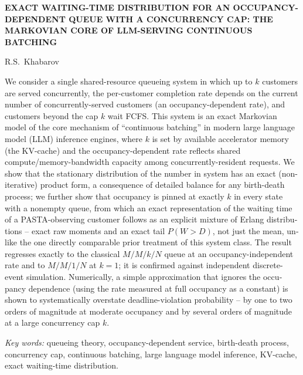 \documentclass[12pt,a4paper]{article}
\begin{document}
\bigskip
\begin{center}
\begin{minipage}{0.9\linewidth}
\centering
{\bfseries EXACT WAITING-TIME DISTRIBUTION FOR AN OCCUPANCY-DEPENDENT QUEUE WITH A CONCURRENCY CAP: THE MARKOVIAN CORE OF LLM-SERVING CONTINUOUS BATCHING}
\end{minipage}
\end{center}

\begin{center}
\small R.S.~Khabarov
\end{center}

\begin{otherlanguage}{english}
\small
We consider a single shared-resource queueing system in which up to $k$ customers are served concurrently, the per-customer completion rate depends on the current number of concurrently-served customers (an occupancy-dependent rate), and customers beyond the cap $k$ wait FCFS. This system is an exact Markovian model of the core mechanism of ``continuous batching'' in modern large language model (LLM) inference engines, where $k$ is set by available accelerator memory (the KV-cache) and the occupancy-dependent rate reflects shared compute/memory-bandwidth capacity among concurrently-resident requests. We show that the stationary distribution of the number in system has an exact (non-iterative) product form, a consequence of detailed balance for any birth-death process; we further show that occupancy is pinned at exactly $k$ in every state with a nonempty queue, from which an exact representation of the waiting time of a PASTA-observing customer follows as an explicit mixture of Erlang distributions -- exact raw moments and an exact tail $P(W>D)$, not just the mean, unlike the one directly comparable prior treatment of this system class. The result regresses exactly to the classical $M/M/k/N$ queue at an occupancy-independent rate and to $M/M/1/N$ at $k=1$; it is confirmed against independent discrete-event simulation. Numerically, a simple approximation that ignores the occupancy dependence (using the rate measured at full occupancy as a constant) is shown to systematically overstate deadline-violation probability -- by one to two orders of magnitude at moderate occupancy and by several orders of magnitude at a large concurrency cap $k$.

\medskip
\noindent\textit{Key words:} queueing theory, occupancy-dependent service, birth-death process, concurrency cap, continuous batching, large language model inference, KV-cache, exact waiting-time distribution.
\end{otherlanguage}
\normalsize
\end{document}
